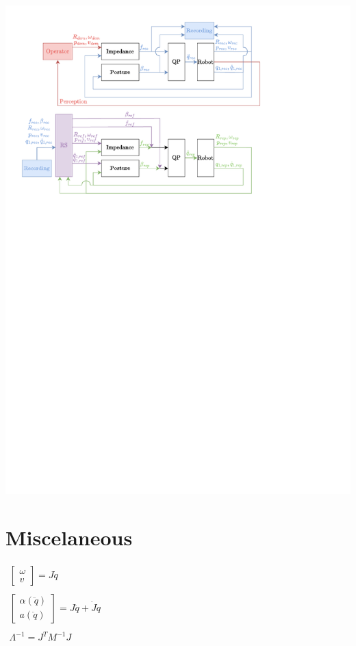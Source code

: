 \documentclass[11pt]{report}
\numberwithin{equation}{section}        %
\numberwithin{figure}{section}          %
\numberwithin{table}{section}           %
\begin{document}
\includegraphics[trim={1cm 17.8cm 5cm 6.5cm}, clip]{Graphics/qp.pdf}

\section*{Miscelaneous}
$\begin{array}{l}
\begin{bmatrix}
\omega\\ 
v
\end{bmatrix} = J\dot{q}\\\\
\begin{bmatrix}
\alpha(\ddot{q})\\ 
a(\ddot{q})
\end{bmatrix} = J\ddot{q} + \dot{J}\dot{q}\\\\
\Lambda^{-1} = J^TM^{-1}J
\end{array}$
\end{document}
